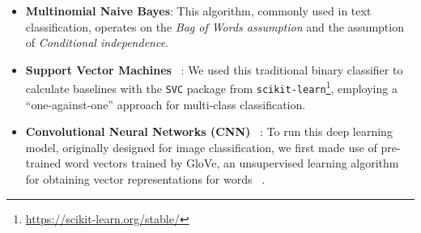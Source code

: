 \documentclass[11pt]{article}
\begin{document}
\begin{itemize}
    \item \textbf{Multinomial Naive Bayes}: This algorithm, commonly used in text classification, operates on the \emph{Bag of Words assumption} and the assumption of \emph{Conditional independence}.
    \item \textbf{Support Vector Machines} ~\cite{tong2001support}: We used this traditional binary classifier to calculate baselines with the \texttt{SVC} package from \texttt{scikit-learn}\footnote{\url{https://scikit-learn.org/stable/}}, employing a ``one-against-one'' approach for multi-class classification.
    \item \textbf{Convolutional Neural Networks (CNN)} ~\cite{DBLP:journals/corr/Kim14f,lecun1998gradient}: To run this deep learning model, originally designed for image classification, we first made use of pre-trained word vectors trained by GloVe, an unsupervised learning algorithm for obtaining vector representations for words ~\cite{Pennington_Socher_Manning_2014}.%
\end{itemize}


\end{document}
